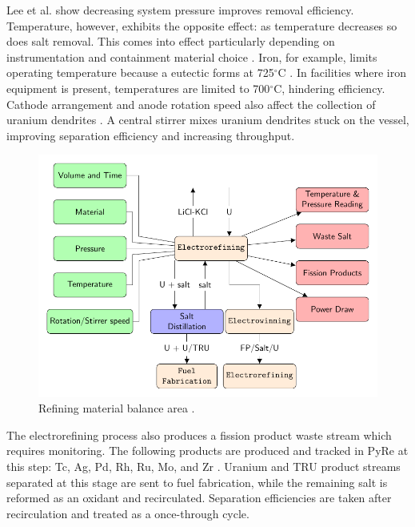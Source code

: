 Lee et al. \cite{lee_advanced_2008} show decreasing system pressure improves removal efficiency. 
Temperature, however, exhibits the opposite effect: as temperature decreases so does salt removal. This comes into effect 
particularly depending on instrumentation and containment material choice \cite{lee_advanced_2008}. 
Iron, for example, limits operating temperature because a eutectic forms at 725$^{\circ}$C \cite{chapman_revision_1984}.
In facilities where iron equipment is present, temperatures are limited to 700$^{\circ}$C, hindering efficiency. 
Cathode arrangement and anode rotation speed also affect the collection of uranium 
dendrites \cite{lee_advanced_2008}. A central stirrer mixes uranium dendrites stuck on 
the vessel, improving separation efficiency and increasing throughput. 

\begin{figure}[h]
	\centering
	\includegraphics[width=0.85\linewidth]{images/refining}
	\caption{Refining material balance area \cite{lee_advanced_2008}.}
	\label{fig:refining}
\end{figure}

The electrorefining process also produces a fission product waste stream which requires monitoring. 
The following products are produced and tracked in \gls{PyRe} at this step: Tc, Ag, Pd, Rh, Ru, Mo, and Zr \cite{flowsheet_1998}. 
Uranium and \gls{TRU} product streams separated at this stage are sent to fuel fabrication, while the remaining salt is reformed as an oxidant and recirculated.
Separation efficiencies are taken after recirculation and treated as a once-through cycle. 

